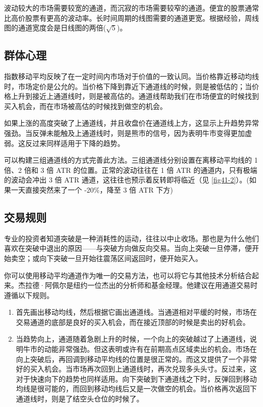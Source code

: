 波动较大的市场需要较宽的通道，而沉寂的市场需要较窄的通道。便宜的股票通常比高价股票有更高的波动率。长时间周期的线图需要的通道更宽。根据经验，周线图的通道宽度会是日线图的两倍($\sqrt{5}$)。

\subsection*{群体心理}
指数移动平均反映了在一定时间内市场对于价值的一致认同。当价格靠近移动均线时，市场定价是公允的。当价格下降到靠近下通道线的时候，则是被低估的；当价格上升到接近上通道线时，则是被高估的。通道线帮助我们在市场便宜的时候找到买入机会，而在市场被高估的时候找到做空的机会。

如果上涨的高度突破了上通道线，并且收盘价在通道线上方，这显示上升趋势异常强劲。当反弹未能触及上通道线时，则是熊市的信号，因为表明牛市变得更加虚弱。这反过来同样适用于下降的趋势。

可以构建三组通道线的方式完善此方法。三组通道线分别设置在离移动平均线的 1 倍、2 倍和 3 倍 ATR 的位置。正常的波动往往在 1 倍 ATR 的通道内，只有极端的波动会冲出 3 倍 ATR 通道，这往往也预示着反转即将临近（见 \autoref{fig41-2}）。(如果一天直接突然来了一个 -20\%，降至 3 倍 ATR 下方)

\subsection*{交易规则}
专业的投资者知道突破是一种消耗性的运动，往往以中止收场。那也是为什么他们喜欢在突破中退出的原因——与突破方向做反向交易。当向上突破一旦停滞，便开始卖空；或向下突破一旦开始往震荡区间返回时，便开始买入。

你可以使用移动平均通道作为唯一的交易方法，也可以将它与其他技术分析结合起来。杰拉德·阿佩尔是纽约一位杰出的分析师和基金经理。他建议在用通道交易时遵循以下规则。
\begin{enumerate}
    \item 首先画出移动均线，然后根据它画出通道线。当通道相对平缓的时候，市场在交易通道的底部是良好的买入机会，而在接近顶部的时候是卖出的好机会。
    \item 当趋势向上，通道随着急剧上升的时候，一个向上的突破越过了上通道线，说明牛市的动能非常强劲。但这表明或许有在前期高点区域卖出的机会。市场在向上突破后，再回调到移动平均线的位置是很正常的。而这又提供了一个非常好的买入机会。当市场再次回到上通道线时，再次兑现多头头寸。反过来，这对于快速向下的趋势也同样适用。向下突破到下通道线之下时，反弹回到移动均线是很可能的，而回到移动均线后又是一次做空的机会。当价格再次返回下通道线时，则是了结空头仓位的时候了。
\end{enumerate}

